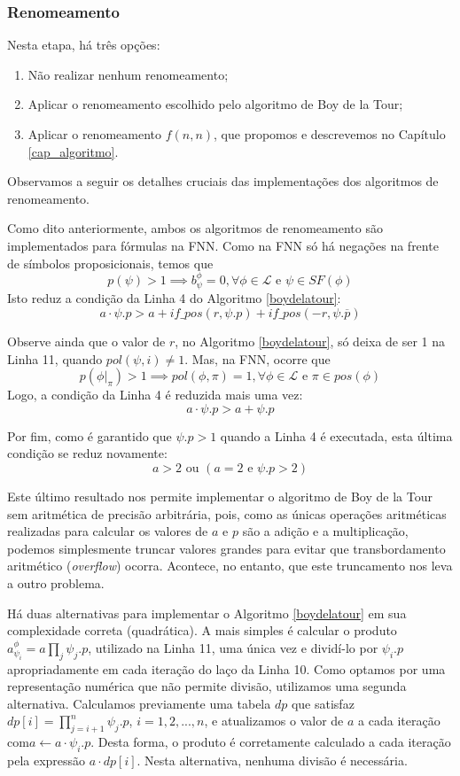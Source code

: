 \subsubsection{Renomeamento}

\indent

Nesta etapa, há três opções:
\begin{enumerate}
	\item Não realizar nenhum renomeamento;
	\item Aplicar o renomeamento escolhido pelo algoritmo de Boy de la Tour;
	\item Aplicar o renomeamento $f(n,n)$, que propomos e descrevemos no Capítulo \ref{cap_algoritmo}.
\end{enumerate}

Observamos a seguir os detalhes cruciais das implementações dos algoritmos de renomeamento.

Como dito anteriormente, ambos os algoritmos de renomeamento são implementados para fórmulas na FNN. Como na FNN só há negações na frente de símbolos proposicionais, temos que $$p(\psi) > 1 \implies b_\psi^\phi = 0, \forall \phi \in \mathcal{L} \text{ e } \psi \in SF(\phi)$$ Isto reduz a condição da Linha 4 do Algoritmo \ref{boydelatour}: $$a \cdot \psi.p > a + if\_pos(r,\psi.p) + if\_pos(-r,\psi.\overline{p})$$

Observe ainda que o valor de $r$, no Algoritmo \ref{boydelatour}, só deixa de ser 1 na Linha 11, quando $pol(\psi,i) \neq 1$. Mas, na FNN, ocorre que $$p(\phi|_\pi) > 1 \implies pol(\phi,\pi) = 1,\forall \phi \in \mathcal{L} \text{ e } \pi \in pos(\phi)$$ Logo, a condição da Linha 4 é reduzida mais uma vez: $$a \cdot \psi.p > a + \psi.p$$

Por fim, como é garantido que $\psi.p > 1$ quando a Linha 4 é executada, esta última condição se reduz novamente: $$a > 2 \text{ ou } (a = 2 \text{ e } \psi.p > 2)$$

Este último resultado nos permite implementar o algoritmo de Boy de la Tour sem aritmética de precisão arbitrária, pois, como as únicas operações aritméticas realizadas para calcular os valores de $a$ e $p$ são a adição e a multiplicação, podemos simplesmente truncar valores grandes para evitar que transbordamento aritmético (\textit{overflow}) ocorra. Acontece, no entanto, que este truncamento nos leva a outro problema.

Há duas alternativas para implementar o Algoritmo \ref{boydelatour} em sua complexidade correta (quadrática). A mais simples é calcular o produto $a_{\psi_i}^\phi = a \prod_{j} \psi_j.p$, utilizado na Linha 11, uma única vez e dividí-lo por $\psi_i.p$ apropriadamente em cada iteração do laço da Linha 10. Como optamos por uma representação numérica que não permite divisão, utilizamos uma segunda alternativa. Calculamos previamente uma tabela $dp$ que satisfaz\break $dp[i] = \prod_{j=i+1}^{n} \psi_j.p$, $i = 1,2,...,n$, e atualizamos o valor de $a$ a cada iteração com\break $a \gets a \cdot \psi_i.p$. Desta forma, o produto é corretamente calculado a cada iteração pela expressão $a \cdot dp[i]$. Nesta alternativa, nenhuma divisão é necessária.

